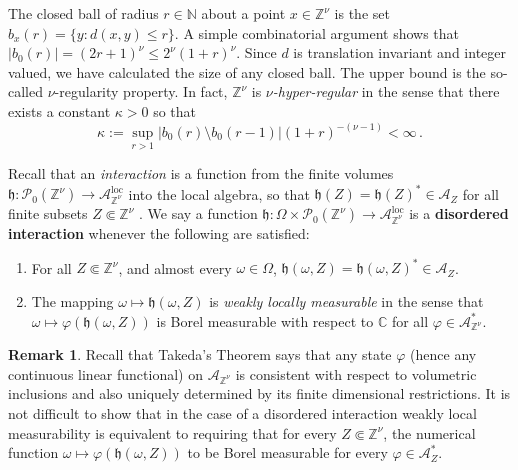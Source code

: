\documentclass{article}
\newcommand{\Znu}{\mathbb{Z}^\nu}
\newcommand{\C}{\mathbb C}
\newcommand{\Z}{\mathbb Z}
\newcommand{\A}{\mathcal{A}}
\newcommand{\N}{\mathbb N}
\DeclareMathOperator{\loc}{loc}
\newcommand{\aloc}{\mathcal{A}_{\mathbb{Z}^\nu}^{\loc}}
\newcommand{\<}{\langle}
\renewcommand{\>}{\rangle}
\newcommand{\h}{\mathfrak{h}}
\theoremstyle{definition}
\newtheorem{rmk}[thm]{Remark}
\numberwithin{equation}{section}
\begin{document}
The closed ball of radius $r\in \N$ about a point $x\in \Znu$ is the set $b_x(r) = \{y\colon d(x,y) \le r\}$. A simple combinatorial argument shows that $|b_0(r)| = (2r+1)^\nu \le 2^\nu (1+r)^\nu$. Since $d$ is translation invariant and integer valued, we have calculated the size of any closed ball. The upper bound is the so-called $\nu$-regularity property. In fact, $\Z^\nu$ is \emph{$\nu$-hyper-regular} in the sense that there exists a constant $\kappa>0$ so that 
\begin{equation}
	\kappa:= \sup_{r>1} |b_0(r) \setminus b_0(r-1)| (1+r)^{-(\nu-1)} <\infty\,.
\end{equation} 

Recall that an \emph{interaction} is a function from the finite volumes $\h: \mathscr{P}_0(\Znu) \to \aloc$ into the local algebra, so that $\h(Z) = \h(Z)^* \in \A_Z$ for all finite subsets $Z\Subset \Znu$ \cite{BratteliRobinsonII, NachtergaeleOgataSims}. We say a function $\h: \Omega \times \mathscr{P}_0(\Znu) \to \aloc$ is a \textbf{disordered interaction} whenever the following are satisfied: 
\begin{enumerate}[label = \roman*.)]
    \item For all $Z\Subset \Znu$, and almost every $\omega \in \Omega$,  $\h(\omega, Z) = \h(\omega, Z)^* \in \A_Z$. 
    \item The mapping $\omega \mapsto \h(\omega, Z)$ is \emph{weakly locally measurable} in the sense that $\omega \mapsto \varphi(\h(\omega, Z))$ is Borel measurable with respect to $\C$ for all $\varphi \in \A_{\Znu}^*$.
\end{enumerate} 
\begin{rmk}
    Recall that Takeda's Theorem \cite{Takeda} says that any state $\varphi$ (hence any continuous linear functional) on $\A_{\Znu}$ is consistent with respect to volumetric inclusions and also uniquely determined by its finite dimensional restrictions. It is not difficult to show that in the case of a disordered interaction weakly local measurability is equivalent to requiring that for every $Z\Subset \Znu$, the numerical function $\omega \mapsto \varphi(\h(\omega, Z))$ to be Borel measurable for every $\varphi \in \mathcal{A}_{Z}^*$.
\end{rmk}
\end{document}
